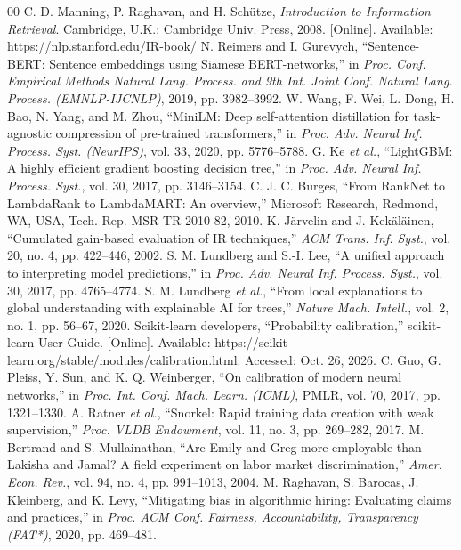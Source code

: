 \documentclass[conference]{IEEEtran}
\begin{document}
\begin{thebibliography}{00}
 C. D. Manning, P. Raghavan, and H. Sch\"utze, \textit{Introduction to Information Retrieval}. Cambridge, U.K.: Cambridge Univ. Press, 2008. [Online]. Available: https://nlp.stanford.edu/IR-book/
 N. Reimers and I. Gurevych, ``Sentence-BERT: Sentence embeddings using Siamese BERT-networks,'' in \textit{Proc. Conf. Empirical Methods Natural Lang. Process. and 9th Int. Joint Conf. Natural Lang. Process. (EMNLP-IJCNLP)}, 2019, pp. 3982--3992.
 W. Wang, F. Wei, L. Dong, H. Bao, N. Yang, and M. Zhou, ``MiniLM: Deep self-attention distillation for task-agnostic compression of pre-trained transformers,'' in \textit{Proc. Adv. Neural Inf. Process. Syst. (NeurIPS)}, vol. 33, 2020, pp. 5776--5788.
 G. Ke \textit{et al.}, ``LightGBM: A highly efficient gradient boosting decision tree,'' in \textit{Proc. Adv. Neural Inf. Process. Syst.}, vol. 30, 2017, pp. 3146--3154.
 C. J. C. Burges, ``From RankNet to LambdaRank to LambdaMART: An overview,'' Microsoft Research, Redmond, WA, USA, Tech. Rep. MSR-TR-2010-82, 2010.
 K. J\"arvelin and J. Kek\"al\"ainen, ``Cumulated gain-based evaluation of IR techniques,'' \textit{ACM Trans. Inf. Syst.}, vol. 20, no. 4, pp. 422--446, 2002.
 S. M. Lundberg and S.-I. Lee, ``A unified approach to interpreting model predictions,'' in \textit{Proc. Adv. Neural Inf. Process. Syst.}, vol. 30, 2017, pp. 4765--4774.
 S. M. Lundberg \textit{et al.}, ``From local explanations to global understanding with explainable AI for trees,'' \textit{Nature Mach. Intell.}, vol. 2, no. 1, pp. 56--67, 2020.
 Scikit-learn developers, ``Probability calibration,'' scikit-learn User Guide. [Online]. Available: https://scikit-learn.org/stable/modules/calibration.html. Accessed: Oct. 26, 2026.
 C. Guo, G. Pleiss, Y. Sun, and K. Q. Weinberger, ``On calibration of modern neural networks,'' in \textit{Proc. Int. Conf. Mach. Learn. (ICML)}, PMLR, vol. 70, 2017, pp. 1321--1330.
 A. Ratner \textit{et al.}, ``Snorkel: Rapid training data creation with weak supervision,'' \textit{Proc. VLDB Endowment}, vol. 11, no. 3, pp. 269--282, 2017.
 M. Bertrand and S. Mullainathan, ``Are Emily and Greg more employable than Lakisha and Jamal? A field experiment on labor market discrimination,'' \textit{Amer. Econ. Rev.}, vol. 94, no. 4, pp. 991--1013, 2004.
 M. Raghavan, S. Barocas, J. Kleinberg, and K. Levy, ``Mitigating bias in algorithmic hiring: Evaluating claims and practices,'' in \textit{Proc. ACM Conf. Fairness, Accountability, Transparency (FAT*)}, 2020, pp. 469--481.

\end{thebibliography}
\end{document}
